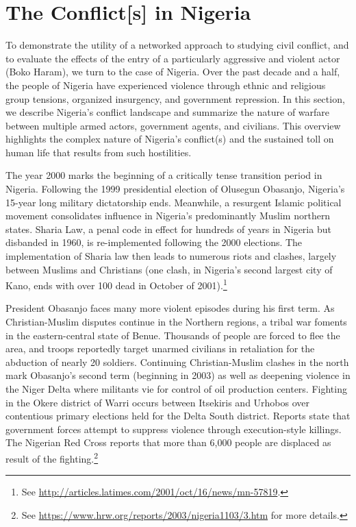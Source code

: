\section*{The Conflict[s] in Nigeria}

To demonstrate the utility of a networked approach to studying civil conflict, and to evaluate the effects of the entry of a particularly aggressive and violent actor (Boko Haram), we turn to the case of Nigeria. Over the past decade and a half, the people of Nigeria have experienced violence through ethnic and religious group tensions, organized insurgency, and government repression. In this section, we describe Nigeria's conflict landscape and summarize the nature of warfare between multiple armed actors, government agents, and civilians. This overview highlights the complex nature of Nigeria's conflict(s) and the sustained toll on human life that results from such hostilities.

The year 2000 marks the beginning of a critically tense transition period in Nigeria. Following the 1999 presidential election of Olusegun Obasanjo, Nigeria's 15-year long military dictatorship ends. Meanwhile, a resurgent Islamic political movement consolidates influence in Nigeria's predominantly Muslim northern states. Sharia Law, a penal code in effect for hundreds of years in Nigeria but disbanded in 1960, is re-implemented following the 2000 elections. The implementation of Sharia law then leads to numerous riots and clashes, largely between Muslims and Christians (one clash, in Nigeria's second largest city of Kano, ends with over 100 dead in October of 2001).\footnote{See \url{http://articles.latimes.com/2001/oct/16/news/mn-57819}.}

President Obasanjo faces many more violent episodes during his first term. As Christian-Muslim disputes continue in the Northern regions, a tribal war foments in the eastern-central state of Benue. Thousands of people are forced to flee the area, and troops reportedly target unarmed civilians in retaliation for the abduction of nearly 20 soldiers. Continuing Christian-Muslim clashes in the north mark Obasanjo's second term (beginning in 2003) as well as deepening violence in the Niger Delta where militants vie for control of oil production centers. Fighting in the Okere district of Warri occurs between Itsekiris and Urhobos over contentious primary elections held for the Delta South district. Reports state that government forces attempt to suppress violence through execution-style killings. The Nigerian Red Cross reports that more than 6,000 people are displaced as result of the fighting.\footnote{See \url{https://www.hrw.org/reports/2003/nigeria1103/3.htm} for more details.}

